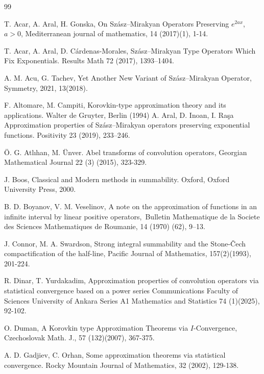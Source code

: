 \documentclass{amsart}
\theoremstyle{plain}
\numberwithin{equation}{section}
\begin{document}
\begin{thebibliography}{99} 

T. Acar, A. Aral, H. Gonska, On Sz\'{a}sz--Mirakyan
Operators Preserving $e^{2ax}$, $a>0$, Mediterranean journal of mathematics,
14 (2017)(1), 1-14.

T. Acar, A. Aral, D. C\'{a}rdenas-Morales,
Sz\'{a}sz--Mirakyan Type Operators Which Fix Exponentials. Results Math 72
(2017), 1393--1404.

A. M. Acu, G. Tachev, Yet Another New Variant of
Sz\'{a}sz--Mirakyan Operator, Symmetry, 2021, 13(2018).

 F. Altomare, M. Campiti, Korovkin-type approximation theory and its applications. Walter de Gruyter,
Berlin (1994)
A. Aral, D. Inoan, I. Ra\c{s}a Approximation
properties of Sz\'{a}sz--Mirakyan operators preserving exponential functions.
Positivity 23 (2019), 233--246.

\"{O}. G. Atl\i han, M. \"{U}nver. Abel transforms of
convolution operators, Georgian Mathematical Journal 22 (3) (2015), 323-329.


J. Boos, Classical and Modern methods in summability. Oxford,
Oxford University Press, 2000.

B. D. Boyanov, V. M. Veselinov, A note on the
approximation of functions in an infinite interval by linear positive
operators,\ Bulletin Mathematique de la Societe des Sciences Mathematiques de
Roumanie, 14 (1970) (62), 9--13.

J. Connor, M. A. Swardson, Strong integral summability and
the Stone-\v{C}ech compactification of the half-line, Pacific Journal of
Mathematics, 157(2)(1993), 201-224.

R. Dinar, T. Yurdakadim, Approximation properties of
convolution operators via statistical convergence based on a power series
Communications Faculty of Sciences University of Ankara Series A1 Mathematics
and Statistics 74 (1)(2025), 92-102.

O. Duman, A Korovkin type Approximation Theorems via
$I$-Convergence, Czechoslovak Math. J., 57 (132)(2007), 367-375.

A. D. Gadjiev, C. Orhan, Some approximation theorems
via statistical convergence. Rocky Mountain Journal of Mathematics, 32 (2002), 129-138.



\end{thebibliography}
\end{document}
